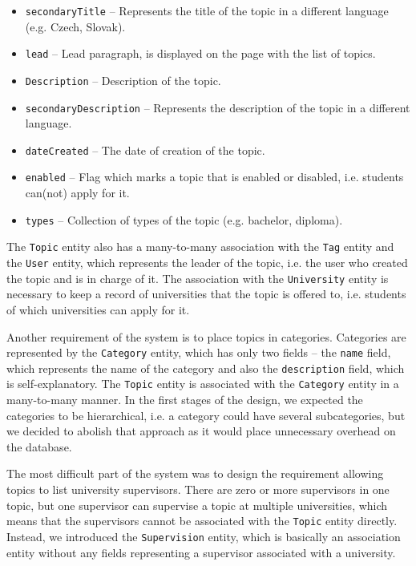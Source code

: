 \begin{itemize}
    \item \texttt{secondaryTitle} -- Represents the title of the topic in a different language (e.g. Czech, Slovak).
    \item \texttt{lead} -- Lead paragraph, is displayed on the page with the list of topics.
    \item \texttt{Description} -- Description of the topic.
    \item \texttt{secondaryDescription} -- Represents the description of the topic in a different language.
    \item \texttt{dateCreated} -- The date of creation of the topic.
    \item \texttt{enabled} -- Flag which marks a topic that is enabled or disabled, i.e. students can(not) apply for it.
    \item \texttt{types} -- Collection of types of the topic (e.g. bachelor, diploma).
\end{itemize}

The \texttt{Topic} entity also has a many-to-many association with the \texttt{Tag} entity and the \texttt{User} entity, which represents the leader of the topic, i.e. the user who created the topic and is in charge of it. The association with the \texttt{University} entity is necessary to keep a record of universities that the topic is offered to, i.e. students of which universities can apply for it.

Another requirement of the system is to place topics in categories. Categories are represented by the \texttt{Category} entity, which has only two fields -- the \texttt{name} field, which represents the name of the category and also the \texttt{description} field, which is self-explanatory. The \texttt{Topic} entity is associated with the \texttt{Category} entity in a many-to-many manner. In the first stages of the design, we expected the categories to be hierarchical, i.e. a category could have several subcategories, but we decided to abolish that approach as it would place unnecessary overhead on the database.

The most difficult part of the system was to design the requirement allowing topics to list university supervisors. There are zero or more supervisors in one topic, but one supervisor can supervise a topic at multiple universities, which means that the supervisors cannot be associated with the \texttt{Topic} entity directly. Instead, we introduced the \texttt{Supervision} entity, which is basically an association entity without any fields representing a supervisor associated with a university.


